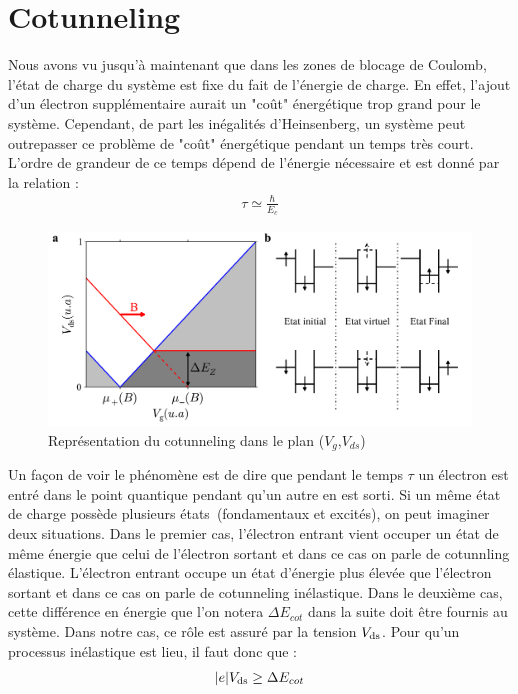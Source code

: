 \section{Cotunneling}
Nous avons vu jusqu'à maintenant que dans les zones de blocage de Coulomb, l'état de charge du système est fixe du fait de l'énergie de charge. En effet, l'ajout d'un électron supplémentaire aurait un "co\^ut" énergétique trop grand pour le système. Cependant, de part les inégalités d'Heinsenberg, un système peut outrepasser ce problème de "co\^ut" énergétique pendant un temps très court. L'ordre de grandeur de ce temps dépend de l'énergie nécessaire et est donné par la relation :
\begin{eqnarray}
\tau \simeq \frac{\hbar}{E_c} \nonumber
\end{eqnarray}


\begin{figure}
\includegraphics[scale=0.5]{Theorie/Transport/figure5/figure5.pdf} 
\caption{Représentation du cotunneling dans le plan ($V_g$,$V_{ds}$)}
\label{charge_discharge}
\end{figure}


Un façon de voir le phénomène est de dire que pendant le temps $\tau$ un électron est entré dans le point quantique pendant qu'un autre en est sorti. Si un m\^eme état de charge possède plusieurs états~(fondamentaux et excités), on peut imaginer deux situations. Dans le premier cas, l'électron entrant vient occuper un état de m\^eme énergie que celui de l'électron sortant et dans ce cas on parle de cotunnling élastique. L'électron entrant occupe un état d'énergie plus élevée que l'électron sortant et dans ce cas on parle de cotunneling inélastique. Dans le deuxième cas, cette différence en énergie que l'on notera $\Delta E_{cot}$ dans la suite doit être fournis au système. Dans notre cas, ce rôle est assuré par la tension $V_{\rm{ds}}$. Pour qu'un processus inélastique est lieu, il faut donc que :
\begin{eqnarray}
|e|V_{\rm{ds}} \geq \Delta E_{cot}
\end{eqnarray}

